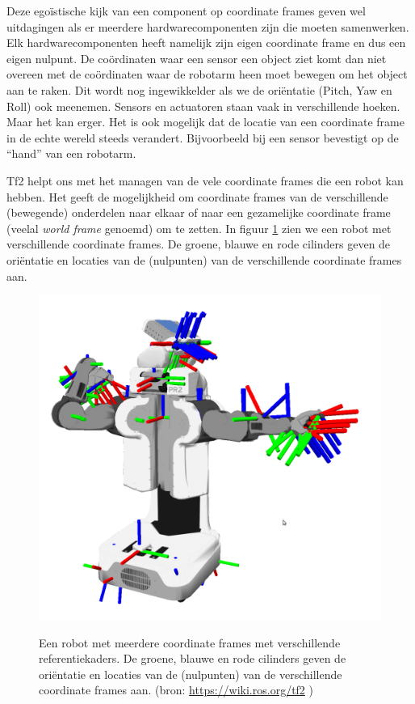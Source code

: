 Deze egoïstische kijk van een component op coordinate frames geven wel uitdagingen als er meerdere hardwarecomponenten zijn die moeten samenwerken. Elk hardwarecomponenten heeft namelijk zijn eigen coordinate frame en dus een eigen nulpunt. De coördinaten waar een sensor een object ziet komt dan niet overeen met de coördinaten waar de robotarm heen moet bewegen om het object aan te raken. Dit wordt nog ingewikkelder als we de oriëntatie (Pitch, Yaw en Roll) ook meenemen. Sensors en actuatoren staan vaak in verschillende hoeken. Maar het kan erger. Het is ook mogelijk dat de locatie van een coordinate frame in de echte wereld steeds verandert. Bijvoorbeeld bij een sensor bevestigt op de ``hand'' van een robotarm.

Tf2 helpt ons met het managen van de vele coordinate frames die een robot kan hebben. Het geeft de mogelijkheid om coordinate frames van de verschillende (bewegende) onderdelen naar elkaar of naar een gezamelijke coordinate frame (veelal \textit{world frame} genoemd) om te zetten. In figuur \ref{fig:coordinateframes} zien we een robot met verschillende coordinate frames. De groene, blauwe en rode cilinders  geven de oriëntatie en locaties van de (nulpunten) van de verschillende coordinate frames aan.

\begin{figure}[ht]
\begin{center}
\includegraphics[scale=0.2]{Pictures/robot_multiple_coordinatesystems.png}\\
\end{center}
\caption{Een robot met meerdere coordinate frames met verschillende referentiekaders. De groene, blauwe en rode cilinders  geven de oriëntatie en locaties van de (nulpunten) van de verschillende coordinate frames aan. \tiny{(bron: \url{https://wiki.ros.org/tf2} \cite{tf2-frames})}}
\label{fig:coordinateframes}
\end{figure}

